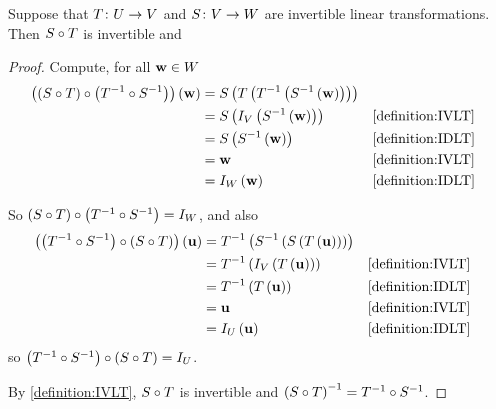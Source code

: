 \documentclass{ximera}
\begin{document}
\begin{theorem}
\label{theorem:ICLT}


Suppose that $T\colon U\rightarrow V$ and $S\colon V\rightarrow W$ are invertible linear transformations. Then ${S}\circ{T}$ is invertible and

\begin{multipleChoice}
\end{multipleChoice}


\begin{proof}
Compute, for all $\mathbf{w}\in W$
\begin{align*}
\left({\left({S}\circ{T}\right)}\circ{\left({T^{-1}}\circ{S^{-1}}\right)}\right)\left(\mathbf{w}\right)
&=S\left(T\left(T^{-1}\left(S^{-1}\left(\mathbf{w}\right)\right)\right)\right)\\
&=S\left(I_V\left(S^{-1}\left(\mathbf{w}\right)\right)\right)&&\ref{definition:IVLT}\\
&=S\left(S^{-1}\left(\mathbf{w}\right)\right)&&\ref{definition:IDLT}\\
&=\mathbf{w}&&\ref{definition:IVLT}\\
&=I_W\left(\mathbf{w}\right)&&\ref{definition:IDLT}
\end{align*}




So ${\left({S}\circ{T}\right)}\circ{\left({T^{-1}}\circ{S^{-1}}\right)}=I_W$, and also
\begin{align*}
\left({\left({T^{-1}}\circ{S^{-1}}\right)}\circ{\left({S}\circ{T}\right)}\right)\left(\mathbf{u}\right)
&=T^{-1}\left(S^{-1}\left(S\left(T\left(\mathbf{u}\right)\right)\right)\right)\\
&=T^{-1}\left(I_V\left(T\left(\mathbf{u}\right)\right)\right)&&\ref{definition:IVLT}\\
&=T^{-1}\left(T\left(\mathbf{u}\right)\right)&&\ref{definition:IDLT}\\
&=\mathbf{u}&&\ref{definition:IVLT}\\
&=I_U\left(\mathbf{u}\right)&&\ref{definition:IDLT}
\end{align*}
so ${\left({T^{-1}}\circ{S^{-1}}\right)}\circ{\left({S}\circ{T}\right)}=I_U$.



By \ref{definition:IVLT}, ${S}\circ{T}$ is invertible and $\left({S}\circ{T}\right)^{-1}={T^{-1}}\circ{S^{-1}}$.



\end{proof}
\end{theorem}
\end{document}
